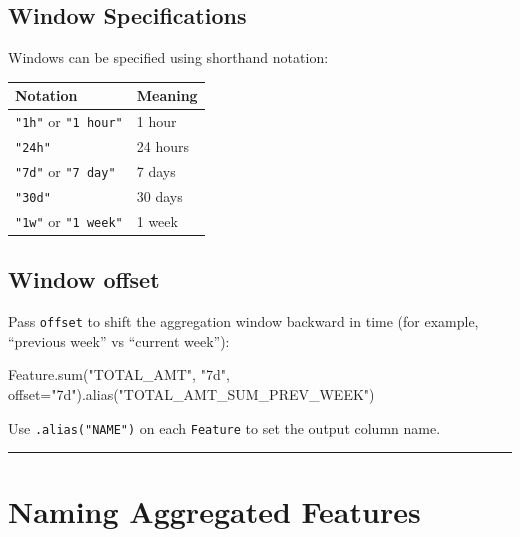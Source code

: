 \documentclass[
  letterpaper,
  DIV=11,
  numbers=noendperiod]{scrreprt}
\newenvironment{Shaded}{\begin{snugshade}}{\end{snugshade}}
\newcommand{\BuiltInTok}[1]{\textcolor[rgb]{0.00,0.23,0.31}{#1}}
\newcommand{\NormalTok}[1]{\textcolor[rgb]{0.00,0.23,0.31}{#1}}
\newcommand{\OperatorTok}[1]{\textcolor[rgb]{0.37,0.37,0.37}{#1}}
\newcommand{\StringTok}[1]{\textcolor[rgb]{0.13,0.47,0.30}{#1}}
\begin{document}
\hypertarget{window-specifications}{%
\subsection{Window Specifications}\label{window-specifications}}

Windows can be specified using shorthand notation:

\begin{longtable}[]{@{}ll@{}}
\toprule\noalign{}
Notation & Meaning \\
\midrule\noalign{}
\endhead
\bottomrule\noalign{}
\endlastfoot
\texttt{"1h"} or \texttt{"1\ hour"} & 1 hour \\
\texttt{"24h"} & 24 hours \\
\texttt{"7d"} or \texttt{"7\ day"} & 7 days \\
\texttt{"30d"} & 30 days \\
\texttt{"1w"} or \texttt{"1\ week"} & 1 week \\
\end{longtable}

\hypertarget{window-offset}{%
\subsection{Window offset}\label{window-offset}}

Pass \texttt{offset} to shift the aggregation window backward in time
(for example, ``previous week'' vs ``current week''):

\begin{Shaded}
\begin{Highlighting}[]
\NormalTok{Feature.}\BuiltInTok{sum}\NormalTok{(}\StringTok{"TOTAL\_AMT"}\NormalTok{, }\StringTok{"7d"}\NormalTok{, offset}\OperatorTok{=}\StringTok{"7d"}\NormalTok{).alias(}\StringTok{"TOTAL\_AMT\_SUM\_PREV\_WEEK"}\NormalTok{)}
\end{Highlighting}
\end{Shaded}

Use \texttt{.alias("NAME")} on each \texttt{Feature} to set the output
column name.

\begin{center}\rule{0.5\linewidth}{0.5pt}\end{center}

\hypertarget{sec-naming}{%
\section{Naming Aggregated Features}\label{sec-naming}}
\end{document}

